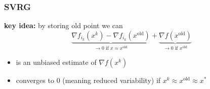 \documentclass{beamer}
\begin{document}
\begin{frame}
  \frametitle{SVRG}
  \textbf{key idea:} by storing old point we can
  \begin{equation}
    \underbrace{\nabla f_{i_k}(x^k) - \nabla f_{i_k}(x^{\text{old}})}_{\text{$\to 0$ if $x\approx x^{\text{old}}$}} + \underbrace{\nabla f(x^{\text{old}})}_{\text{$\to 0$ if $x^{\text{old}}$}}
  \end{equation}
  \begin{itemize}
    \item is an unbiased estimate of $\nabla f(x^k)$
    \item converges to $0$ (meaning reduced variability) if $x^k\approx x^{\text{old}} \approx x^*$
  \end{itemize}

\end{frame}

\end{document}
